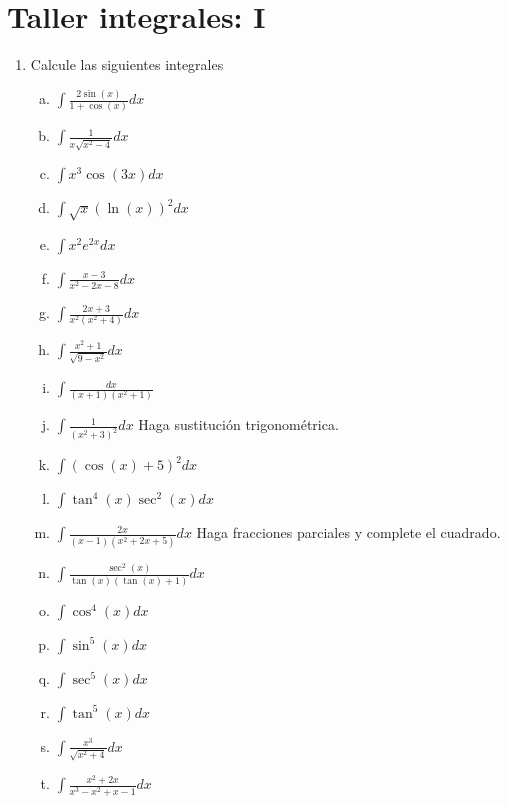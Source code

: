 \documentclass[12pt]{amsart}  %
\begin{document}
\section{Taller integrales: I}
\begin{enumerate}
\item Calcule las siguientes integrales
\begin{enumerate}[a):]
\item $\displaystyle{\int \frac{2\sin(x)}{1+\cos(x)}dx}$
\item $\displaystyle{\int \frac{1}{x\sqrt{x^2-4}}dx}$
\item $\displaystyle{\int x^3\cos(3x) dx}$
\item $\displaystyle{\int \sqrt{x}\left(\ln(x)\right)^2 dx}$
\item $\displaystyle{\int x^2 e^{2x} dx}$
\item $\displaystyle{\int \frac{x-3}{x^2-2x-8} dx}$
\item $\displaystyle{\int \frac{2x+3}{x^{2}(x^{2}+4)} dx}$
\item $\displaystyle{\int \frac{x^2+1}{\sqrt{9-x^2}} dx}$
\item $\displaystyle{\int \frac{dx}{(x+1)(x^2+1)}}$
\item $\displaystyle{\int \frac{1}{(x^2+3)^{2}} dx}$ Haga sustituci\'on trigonom\'etrica.
\item $\displaystyle{\int (\cos(x)+5)^2 dx}$
\item $\displaystyle{\int \tan^{4}(x)\sec^{2}(x) dx}$
\item $\displaystyle{\int \frac{2x}{(x-1)(x^{2}+2x+5)} dx}$ Haga fracciones parciales y complete el cuadrado.
\item $\displaystyle{\int \frac{\sec^{2}(x)}{\tan(x)(\tan(x)+1)} dx}$
\item $\displaystyle{\int \cos^{4}(x) dx}$
\item $\displaystyle{\int \sin^{5}(x) dx}$
\item $\displaystyle{\int \sec^{5}(x) dx}$
\item $\displaystyle{\int \tan^5(x) dx}$
\item $\displaystyle{\int \frac{x^3}{\sqrt{x^2+4}}dx}$
\item $\displaystyle{\int \frac{x^2+2x}{x^3-x^2+x-1}dx}$
\end{enumerate}
\end{enumerate}
\end{document}
